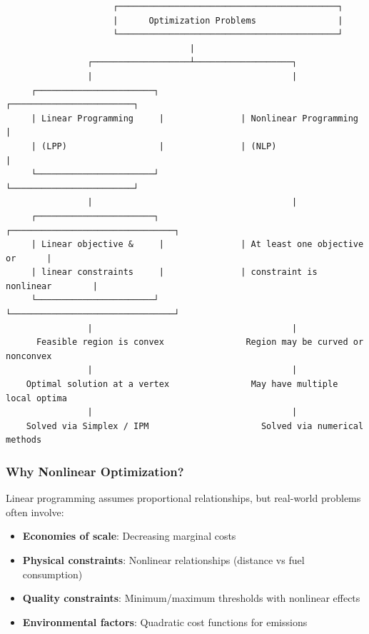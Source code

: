 \documentclass[
  letterpaper,
  DIV=11,
  numbers=noendperiod]{scrreprt}
\providecommand{\tightlist}{%
  \setlength{\itemsep}{0pt}\setlength{\parskip}{0pt}}
\begin{document}
\begin{verbatim}
                     ┌───────────────────────────────────────────┐
                     |      Optimization Problems                |
                     └───────────────────────────────────────────┘
                                    |
                ┌───────────────────┴───────────────────┐
                |                                       |
     ┌───────────────────────┐               ┌────────────────────────┐
     | Linear Programming     |               | Nonlinear Programming  |
     | (LPP)                  |               | (NLP)                  |
     └───────────────────────┘               └────────────────────────┘
                |                                       |
     ┌───────────────────────┐               ┌────────────────────────────────┐
     | Linear objective &     |               | At least one objective or      |
     | linear constraints     |               | constraint is nonlinear        |
     └───────────────────────┘               └────────────────────────────────┘
                |                                       |
      Feasible region is convex                Region may be curved or nonconvex
                |                                       |
    Optimal solution at a vertex                May have multiple local optima
                |                                       |
    Solved via Simplex / IPM                      Solved via numerical methods
\end{verbatim}

\subsubsection{Why Nonlinear
Optimization?}\label{why-nonlinear-optimization}

Linear programming assumes proportional relationships, but real-world
problems often involve:

\begin{itemize}
\tightlist
\item
  \textbf{Economies of scale}: Decreasing marginal costs
\item
  \textbf{Physical constraints}: Nonlinear relationships (distance vs
  fuel consumption)
\item
  \textbf{Quality constraints}: Minimum/maximum thresholds with
  nonlinear effects
\item
  \textbf{Environmental factors}: Quadratic cost functions for emissions
\end{itemize}
\end{document}
